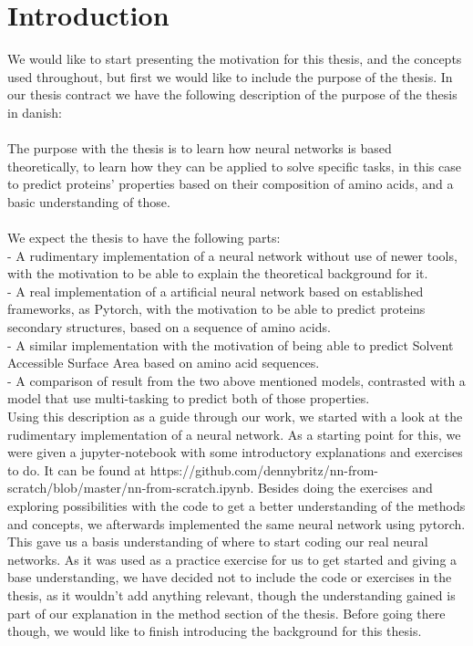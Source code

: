 \section{Introduction}
We would like to start presenting the motivation for this thesis, and the concepts used throughout, but first we would like to include the purpose of the thesis. In our thesis contract we have the following description of the purpose of the thesis in danish:\\\\
The purpose with the thesis is to learn how neural networks is based theoretically, to learn how they can be applied to solve specific tasks, in this case to predict proteins' properties based on their composition of amino acids, and a basic understanding of those. \\\\
We expect the thesis to have the following parts:\\
- A rudimentary implementation of a neural network without use of newer tools, with the motivation to be able to explain the theoretical background for it.\\
- A real implementation of a artificial neural network based on established frameworks, as Pytorch, with the motivation to be able to predict proteins secondary structures, based on a sequence of amino acids. \\
- A similar implementation with the motivation of being able to predict Solvent Accessible Surface Area based on amino acid sequences. \\
- A comparison of result from the two above mentioned models, contrasted with a model that use multi-tasking to predict both of those properties.\\ 

Using this description as a guide through our work, we started with a look at the rudimentary implementation of a neural network. As a starting point for this, we were given a jupyter-notebook with some introductory explanations and exercises to do.
It can be found at https://github.com/dennybritz/nn-from-scratch/blob/master/nn-from-scratch.ipynb.
Besides doing the exercises and exploring possibilities with the code to get a better understanding of the methods and concepts, we afterwards implemented the same neural network using pytorch. 
This gave us a basis understanding of where to start coding our real neural networks. As it was used as a practice exercise for us to get started and giving a base understanding, we have decided not to include the code or exercises in the thesis, as it wouldn't add anything relevant, though the understanding gained is part of our explanation in the method section of the thesis. Before going there though, we would like to finish introducing the background for this thesis.

